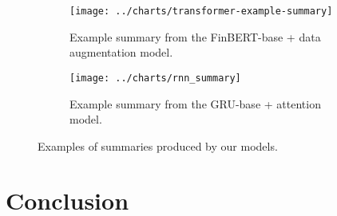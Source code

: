 \begin{figure}[ht]
    \centering
    \begin{subfigure}[t]{0.49\textwidth}
        \centering
        \texttt{[image: ../charts/transformer-example-summary]}
        \caption{Example summary from the FinBERT-base + data augmentation model.}
        \label{fig:finbert_summary}
    \end{subfigure}
    \hfill
    \begin{subfigure}[t]{0.49\textwidth}
        \centering
        \texttt{[image: ../charts/rnn\_summary]}
        \caption{Example summary from the GRU-base + attention model.}
        \label{fig:rnn_summary}
    \end{subfigure}
    \caption{Examples of summaries produced by our models.}
    \label{fig:summary_examples}
\end{figure}


\section{Conclusion}\label{sec:conclusion}
